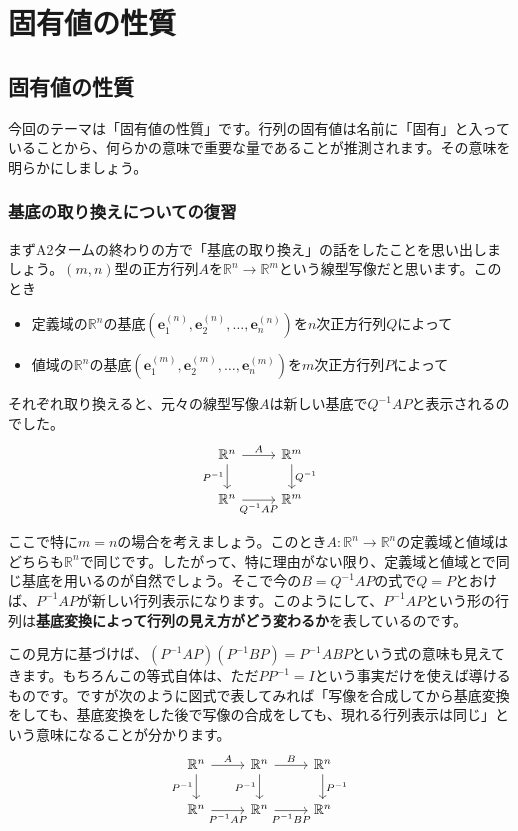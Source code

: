 \chapter{固有値の性質}

\section{固有値の性質}

今回のテーマは「固有値の性質」です。行列の固有値は名前に「固有」と入っていることから、何らかの意味で重要な量であることが推測されます。その意味を明らかにしましょう。

\subsection{基底の取り換えについての復習}

まずA2タームの終わりの方で「基底の取り換え」の話をしたことを思い出しましょう。$(m, n)$型の正方行列$A$を$\mathbb{R}^n \rightarrow \mathbb{R}^m$という線型写像だと思います。このとき
\begin{itemize}
\item 定義域の$\mathbb{R}^n$の基底$(\bm{e}_1^{(n)}, \bm{e}_2^{(n)}, \ldots, \bm{e}_n^{(n)})$を$n$次正方行列$Q$によって
\item 値域の$\mathbb{R}^n$の基底$(\bm{e}_1^{(m)}, \bm{e}_2^{(m)}, \ldots, \bm{e}_n^{(m)})$を$m$次正方行列$P$によって
\end{itemize}
それぞれ取り換えると、元々の線型写像$A$は新しい基底で$Q^{-1} A P$と表示されるのでした。
\[
\begin{tikzcd}
\mathbb{R}^n \arrow{r}{A} \arrow{d}[swap]{P^{-1}} & \mathbb{R}^m \arrow{d}{Q^{-1}} \\
\mathbb{R}^n \arrow{r}[swap]{Q^{-1} A P} & \mathbb{R}^m
\end{tikzcd}
\]

ここで特に$m = n$の場合を考えましょう。このとき$A \colon \mathbb{R}^n \rightarrow \mathbb{R}^n$の定義域と値域はどちらも$\mathbb{R}^n$で同じです。したがって、特に理由がない限り、定義域と値域とで同じ基底を用いるのが自然でしょう。そこで今の$B = Q^{-1} A P$の式で$Q = P$とおけば、$P^{-1} A P$が新しい行列表示になります。このようにして、$P^{-1} A P$という形の行列は\textbf{基底変換によって行列の見え方がどう変わるか}を表しているのです。

この見方に基づけば、$(P^{-1} A P)(P^{-1} B P) = P^{-1} AB P$という式の意味も見えてきます。もちろんこの等式自体は、ただ$P P^{-1} = I$という事実だけを使えば導けるものです。ですが次のように図式で表してみれば「写像を合成してから基底変換をしても、基底変換をした後で写像の合成をしても、現れる行列表示は同じ」という意味になることが分かります。
\[
\begin{tikzcd}
\mathbb{R}^n \arrow{r}{A} \arrow{d}[swap]{P^{-1}} & \mathbb{R}^n \arrow{d}[swap]{P^{-1}}  \arrow{r}{B} & \mathbb{R}^n \ar{d}{P^{-1}} \\
\mathbb{R}^n \arrow{r}[swap]{P^{-1} A P} & \mathbb{R}^n \arrow{r}[swap]{P^{-1} B P} & \mathbb{R}^n
\end{tikzcd}
\]

